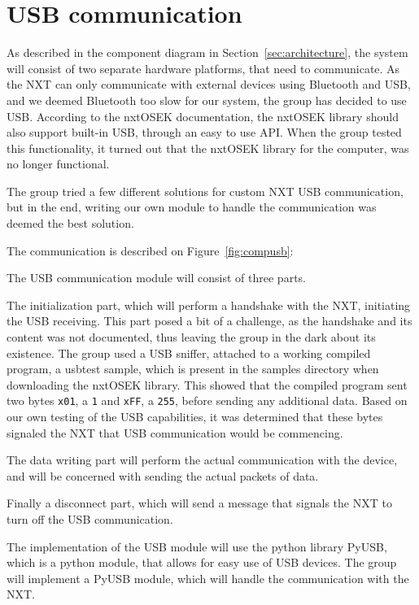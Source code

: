 \section{USB communication}
\label{sec:usb}
As described in the component diagram in Section~\ref{sec:architecture}, the system will consist of two separate hardware platforms, that need to communicate.
As the NXT can only communicate with external devices using Bluetooth and USB, and we deemed Bluetooth too slow for our system, the group has decided to use USB.
According to the nxtOSEK documentation, the nxtOSEK library should also support built-in USB, through an easy to use API\cite{ecrobotUSB}.
When the group tested this functionality, it turned out that the nxtOSEK library for the computer, was no longer functional.

The group tried a few different solutions for custom NXT USB communication, but in the end, writing our own module to handle the communication was deemed the best solution.

The communication is described on Figure~\ref{fig:compusb}:


The USB communication module will consist of three parts.

The initialization part, which will perform a handshake with the NXT, initiating the USB receiving.
This part posed a bit of a challenge, as the handshake and its content was not documented, thus leaving the group in the dark about its existence.
The group used a USB sniffer, attached to a working compiled program, a usbtest sample, which is present in the samples directory when downloading the nxtOSEK library\cite{ecrobotUSB}.
This showed that the compiled program sent two bytes \texttt{x01}, a \texttt{1} and \texttt{xFF}, a \texttt{255}, before sending any additional data.
Based on our own testing of the USB capabilities, it was determined that these bytes signaled the NXT that USB communication would be commencing.

The data writing part will perform the actual communication with the device, and will be concerned with sending the actual packets of data.

Finally a disconnect part, which will send a message that signals the NXT to turn off the USB communication.



The implementation of the USB module will use the python library PyUSB, which is a python module, that allows for easy use of USB devices\cite{PyUSB}.
The group will implement a PyUSB module, which will handle the communication with the NXT.



